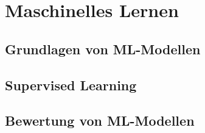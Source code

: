 \section{Maschinelles Lernen}

\subsection{Grundlagen von ML-Modellen}

\subsection{Supervised Learning}

\subsection{Bewertung von ML-Modellen}